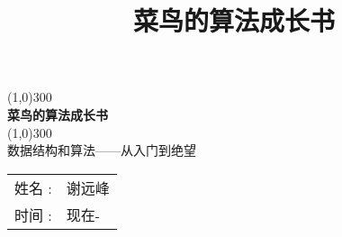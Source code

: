 \documentclass{description/outline}
\title{菜鸟的算法成长书}
\begin{document}
\begin{titlepage}
	\begin{center}
		\line(1,0){300}\\
		\Huge{\bfseries 菜鸟的算法成长书}\\
		\vspace*{-0.7cm}
		\line(1,0){300}\\
		\LARGE {数据结构和算法——从入门到绝望}\\
		[0.6cm]
		\LARGE{
			\begin{tabular}{rl}
				姓名        : & 谢远峰 \\
				时间       :  & 现在-
			\end{tabular}
		}
	\end{center}
\end{titlepage}

\clearpage
\end{document}
